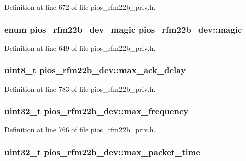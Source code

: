 \-Definition at line 672 of file pios\-\_\-rfm22b\-\_\-priv.\-h.

\hypertarget{structpios__rfm22b__dev_acffebca4153749f86cd6237ac4482f3a}{
\subsubsection[{magic}]{\setlength{\rightskip}{0pt plus 5cm}enum {\bf pios\-\_\-rfm22b\-\_\-dev\-\_\-magic} {\bf pios\-\_\-rfm22b\-\_\-dev\-::magic}}}\label{structpios__rfm22b__dev_acffebca4153749f86cd6237ac4482f3a}


\-Definition at line 649 of file pios\-\_\-rfm22b\-\_\-priv.\-h.

\hypertarget{structpios__rfm22b__dev_ad0342540c88cd117f4c82035cedb1f10}{
\subsubsection[{max\-\_\-ack\-\_\-delay}]{\setlength{\rightskip}{0pt plus 5cm}uint8\-\_\-t {\bf pios\-\_\-rfm22b\-\_\-dev\-::max\-\_\-ack\-\_\-delay}}}\label{structpios__rfm22b__dev_ad0342540c88cd117f4c82035cedb1f10}


\-Definition at line 783 of file pios\-\_\-rfm22b\-\_\-priv.\-h.

\hypertarget{structpios__rfm22b__dev_a98085c05f6be6d71a6fbe868ee5f29ef}{
\subsubsection[{max\-\_\-frequency}]{\setlength{\rightskip}{0pt plus 5cm}uint32\-\_\-t {\bf pios\-\_\-rfm22b\-\_\-dev\-::max\-\_\-frequency}}}\label{structpios__rfm22b__dev_a98085c05f6be6d71a6fbe868ee5f29ef}


\-Definition at line 766 of file pios\-\_\-rfm22b\-\_\-priv.\-h.

\hypertarget{structpios__rfm22b__dev_ab09ddb5c90f5e40bfe8b4be488144ef6}{
\subsubsection[{max\-\_\-packet\-\_\-time}]{\setlength{\rightskip}{0pt plus 5cm}uint32\-\_\-t {\bf pios\-\_\-rfm22b\-\_\-dev\-::max\-\_\-packet\-\_\-time}}}\label{structpios__rfm22b__dev_ab09ddb5c90f5e40bfe8b4be488144ef6}


